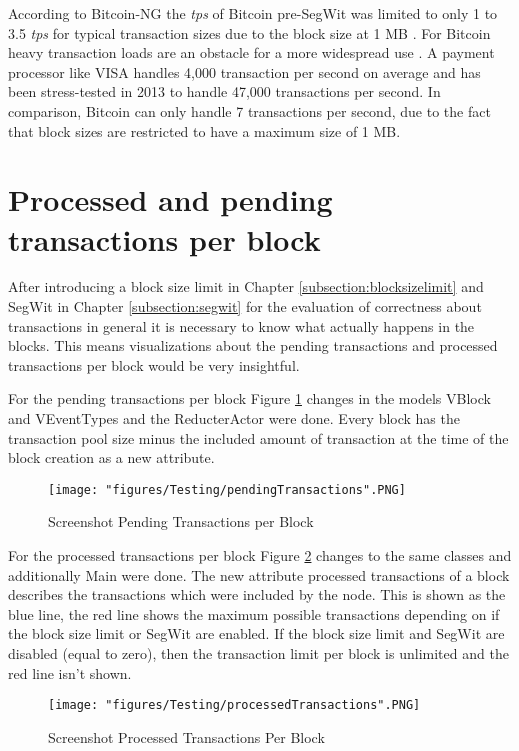 According to Bitcoin-NG the \textit{tps} of Bitcoin pre-SegWit was limited to only 1 to 3.5 \textit{tps} for typical transaction sizes due to the block size at 1 MB \cite{bitcoinNG}. For Bitcoin heavy transaction loads are an obstacle for a more widespread use \cite{gateway}. A payment processor like VISA handles 4,000 transaction per second on average and has been stress-tested in 2013 to handle 47,000 transactions per second. In comparison, Bitcoin can only handle 7 transactions per second, due to the fact that block sizes are restricted to have a maximum size of 1 MB.

\section{Processed and pending transactions per block}

After introducing a block size limit in Chapter \ref{subsection:blocksizelimit} and SegWit in Chapter \ref{subsection:segwit} for the evaluation of correctness about transactions in general it is necessary to know what actually happens in the blocks. This means visualizations about the pending transactions and processed transactions per block would be very insightful.

For the pending transactions per block Figure \ref{fig:pendingTransactions} changes in the models VBlock and VEventTypes and the ReducterActor were done. Every block has the transaction pool size minus the included amount of transaction at the time of the block creation as a new attribute.

\begin{figure}
\centering
\texttt{[image: "figures/Testing/pendingTransactions".PNG]}
\caption{Screenshot Pending Transactions per Block
\label{fig:pendingTransactions}}
\end{figure}

For the processed transactions per block Figure \ref{fig:processedTransactions} changes to the same classes and additionally Main were done. The new attribute processed transactions of a block describes the transactions which were included by the node. This is shown as the blue line, the red line shows the maximum possible transactions depending on if the block size limit or SegWit are enabled. If the block size limit and SegWit are disabled (equal to zero), then the transaction limit per block is unlimited and the red line isn't shown.

\begin{figure}
\centering
\texttt{[image: "figures/Testing/processedTransactions".PNG]}
\caption{Screenshot Processed Transactions Per Block
\label{fig:processedTransactions}}
\end{figure}

